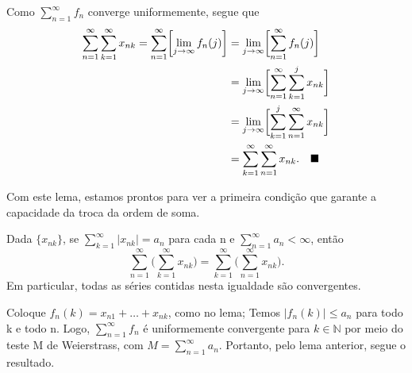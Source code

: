 \documentclass[../analysis_notes.tex]{subfiles}
\begin{document}
\begin{proof*}
	Como \(\sum\limits_{n=1}^{\infty}f_{n}\) converge uniformemente, segue que
	\begin{align*}
		\sum\limits_{n=1}^{\infty}\sum\limits_{k=1}^{\infty}x_{nk}  =\sum\limits_{n=1}^{\infty}\biggl[\lim_{j\to \infty}f_{n}(j)\biggr] & =\lim_{j\to \infty}\biggl[\sum\limits_{n=1}^{\infty}f_{n}(j)\biggr]                    \\
		                                                                                                                                & =\lim_{j\to \infty}\biggl[\sum\limits_{n=1}^{\infty}\sum\limits_{k=1}^{j}x_{nk}\biggr] \\
		                                                                                                                                & =\lim_{j\to \infty}\biggl[\sum\limits_{k=1}^{j}\sum\limits_{n=1}^{\infty}x_{nk}\biggr] \\
		                                                                                                                                & = \sum\limits_{k=1}^{\infty}\sum\limits_{n=1}^{\infty}x_{nk}.\quad \text{$\blacksquare$}
	\end{align*}
\end{proof*}
Com este lema, estamos prontos para ver a primeira condição que garante a capacidade da troca da ordem de soma.
\begin{theorem*}
	Dada \(\{x_{nk}\}\), se \(\sum\limits_{k=1}^{\infty}|x_{nk}|=a_{n}\) para cada n e \(\sum\limits_{n=1}^{\infty}a_{n}<\infty\), então
	\[
		\sum\limits_{n=1}^{\infty}\biggl(\sum\limits_{k=1}^{\infty}x_{nk}\biggr) = \sum\limits_{k=1}^{\infty}\biggl(\sum\limits_{n=1}^{\infty}x_{nk}\biggr).
	\]
	Em particular, todas as séries contidas nesta igualdade são convergentes.
\end{theorem*}
\begin{proof*}
	Coloque \(f_{n}(k)=x_{n1}+\dotsc + x_{nk}\), como no lema; Temos \(|f_{n}(k)|\leq a_{n}\) para todo k e todo n. Logo, \(\sum\limits_{n=1}^{\infty}f_{n}\) é uniformemente convergente para \(k\in \mathbb{N}\) por meio do teste M de Weierstrass, com \(M=\sum\limits_{n=1}^{\infty}a_{n}\). Portanto, pelo lema anterior, segue o resultado. \qedsymbol
\end{proof*}
\end{document}
